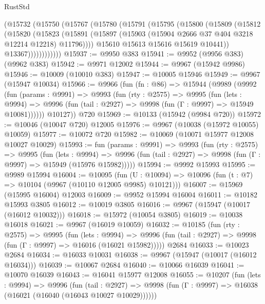 \begin{lexlean}{RustStd}
\begin{coremodule}
            (@15732
              (@15750
                (@15767
                  (@15780
                    (@15791
                      (@15795
                        (@15800
                          (@15809
                            (@15812
                              (@15820
                                (@15823
                                  (@15891
                                    (@15897
                                      (@15903 (@15904 @2666 @37 @404 @3218 @12214 @12218) @11796))))
                                @15610
                                @15613
                                @15616
                                @15619
                                @10441))
                            @13367))))))))))))
@15937 := @9950 @383
@15941 := @9952 (@9956 @383) (@9962 @383)
@15942 := @9971 @12002
@15944 := @9967 (@15942 @9986)
@15946 := @10009 (@10010 @383)
@15947 := @10005 @15946
@15949 := @9967 (@15947 @10034)
@15966 := @9966
    (fun (fn : @86) =>
    @15944
      (@9989
        (@9992
          (fun (params : @9991) =>
          @9993
            (fun (rty : @2575) =>
            @9995
              (fun (lets : @9994) =>
              @9996 (fun (tail : @2927) => @9998 (fun (Γ : @9997) => @15949 @10081))))))
        @10127))
    @720
@15969 := @10133 (@15942 (@9984 @720))
@15972 := @10046 (@10047 @720) @12005
@15976 := @9967 (@10038 (@15972 @10055) @10059)
@15977 := @10072 @720
@15982 := @10069 (@10071 @15977 @12008 @10027 @10029)
@15993 := fun (params : @9991) =>
  @9993
    (fun (rty : @2575) =>
    @9995
      (fun (lets : @9994) =>
      @9996 (fun (tail : @2927) => @9998 (fun (Γ : @9997) => @15949 (@15976 @15982)))))
@15994 := @9992 @15993
@15995 := @9989 @15994
@16004 := @10095
    (fun (U : @10094) => @10096 (fun (t : @7) => @10104 (@9967 (@10110 @12005 @9985) @10121)))
@16007 := @15969 (@15995 @16004) @12003
@16009 := @9952 @15994 @16004
@16011 := @10182 @15993 @3805
@16012 := @10019 @3805
@16016 := @9967 (@15947 (@10017 (@16012 @10032)))
@16018 := @15972 (@10054 @3805)
@16019 := @10038 @16018
@16021 := @9967 (@16019 @10059)
@16032 := @10185
    (fun (rty : @2575) =>
    @9995
      (fun (lets : @9994) =>
      @9996 (fun (tail : @2927) => @9998 (fun (Γ : @9997) => @16016 (@16021 @15982)))))
    @2684
@16033 := @10023 @2684
@16034 := @16033 @10031
@16038 := @9967 (@15947 (@10017 (@16012 @16034)))
@16039 := @10067 @2684
@16040 := @10066 @16039
@16041 := @10070 @16039
@16043 := @16041 @15977 @12008
@16055 := @10207
    (fun (lets : @9994) =>
    @9996
      (fun (tail : @2927) =>
      @9998 (fun (Γ : @9997) => @16038 (@16021 (@16040 (@16043 @10027 @10029))))))

\end{coremodule}
\end{lexlean}

